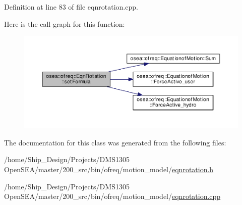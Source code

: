 Definition at line 83 of file eqnrotation.\-cpp.



Here is the call graph for this function\-:
\nopagebreak
\begin{figure}[H]
\begin{center}
\leavevmode
\includegraphics[width=350pt]{classosea_1_1ofreq_1_1_eqn_rotation_a910975e9e2e8d438853a4e7d658850a8_cgraph}
\end{center}
\end{figure}




The documentation for this class was generated from the following files\-:\begin{DoxyCompactItemize}
\item 
/home/\-Ship\-\_\-\-Design/\-Projects/\-D\-M\-S1305 Open\-S\-E\-A/master/200\-\_\-src/bin/ofreq/motion\-\_\-model/\hyperlink{eqnrotation_8h}{eqnrotation.\-h}\item 
/home/\-Ship\-\_\-\-Design/\-Projects/\-D\-M\-S1305 Open\-S\-E\-A/master/200\-\_\-src/bin/ofreq/motion\-\_\-model/\hyperlink{eqnrotation_8cpp}{eqnrotation.\-cpp}\end{DoxyCompactItemize}

